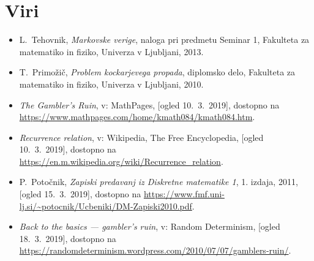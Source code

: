 \documentclass[12pt, a4paper]{article}
\begin{document}
\section[Viri]{Viri}
\begin{itemize}
\item L.~Tehovnik, \emph{Markovske verige}, naloga pri predmetu Seminar 1, Fakulteta za matematiko in fiziko, Univerza v Ljubljani, 2013.
\item T.~Primožič, \emph{Problem kockarjevega propada}, diplomsko delo, Fakulteta za matematiko in fiziko, Univerza v Ljubljani, 2010.
\item \emph{The Gambler's Ruin}, v: MathPages, [ogled 10.~3.~2019], dostopno na \url{https://www.mathpages.com/home/kmath084/kmath084.htm}.
\item \emph{Recurrence relation}, v: Wikipedia, The Free Encyclopedia, [ogled 10.~3.~2019], dostopno na \url{https://en.m.wikipedia.org/wiki/Recurrence_relation}.
\item P.~Potočnik, \emph{Zapiski predavanj iz Diskretne matematike 1}, 1. izdaja, 2011, [ogled 15.~3.~2019], dostopno na \url{https://www.fmf.uni-lj.si/~potocnik/Ucbeniki/DM-Zapiski2010.pdf}.
\item \emph{Back to the basics — gambler’s ruin}, v: Random Determinism, [ogled 18.~3.~2019], dostopno na \url{https://randomdeterminism.wordpress.com/2010/07/07/gamblers-ruin/}.
\end{itemize}
\end{document}
